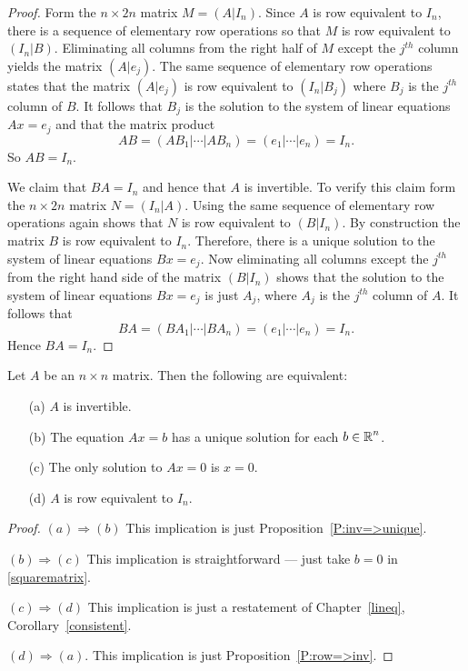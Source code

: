 \documentclass{ximera}
\begin{document}
\begin{proof}  Form the $n\times 2n$ matrix $M=(A|I_n)$.  Since $A$ is row equivalent
to $I_n$, there is a sequence of elementary row operations so that $M$ is
row equivalent to $(I_n|B)$.  Eliminating all columns from the right half
of $M$ except the $j^{th}$ column yields the matrix $(A|e_j)$.  The same
sequence of elementary row operations states that the matrix $(A|e_j)$ is
row equivalent to $(I_n|B_j)$ where $B_j$ is the $j^{th}$ column of $B$.  It
follows that $B_j$ is the solution to the system of linear equations
$Ax=e_j$ and that the matrix product
\[
AB = (AB_1|\cdots|AB_n) = (e_1|\cdots|e_n) = I_n.
\]
So $AB=I_n$.

We claim that $BA=I_n$ and hence that $A$ is invertible.  To verify this claim
form the $n\times 2n$ matrix $N=(I_n|A)$.  Using the same sequence of
elementary row operations again shows that $N$ is row equivalent to $(B|I_n)$.
By construction
the matrix $B$ is row equivalent to $I_n$.  Therefore, there is a unique
solution to the system of linear equations $Bx=e_j$.  Now eliminating all
columns except the $j^{th}$ from the right hand side of the matrix $(B|I_n)$
shows that the solution to the system of linear equations $Bx=e_j$ is just
$A_j$, where $A_j$ is the $j^{th}$ column of $A$.  It follows that
\[
BA = (BA_1|\cdots|BA_n) = (e_1|\cdots|e_n) = I_n.
\]
Hence $BA=I_n$.  \end{proof}

\begin{theorem} \label{invertequiv}
Let $A$ be an $n\times n$ matrix.  Then the following are
equivalent:
\begin{itemize}
\item[(a)]  $A$ is invertible. 
\item[(b)] The equation $Ax=b$ has a unique solution for each
$b\in\mbox{$\Bbb{R}$}^n$.
\item[(c)]  The only solution to $Ax=0$ is $x=0$.
\item[(d)]  $A$ is row equivalent to $I_n$.
\end{itemize}
\end{theorem}

\begin{proof} $(a) \Rightarrow (b)$ This implication
is just Proposition~\ref{P:inv=>unique}.

$(b) \Rightarrow (c)$ This implication is straightforward --- just
take $b=0$ in \eqref{squarematrix}.

$(c) \Rightarrow (d)$  This implication is just a restatement of
Chapter~\ref{lineq}, Corollary~\ref{consistent}.

$(d) \Rightarrow (a)$.  This implication is just
Proposition~\ref{P:row=>inv}. \end{proof}
\end{document}
